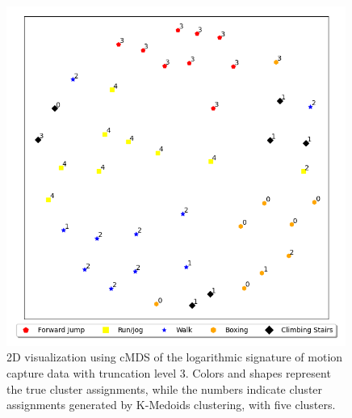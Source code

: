 \begin{figure}
    \centering
    \includegraphics[width=0.99\textwidth]{figures/motion-capture-data/2d_plots/logsig_level3}
    \caption[2D cMDS Visualization of Logarithmic Signature Motion Capture Data (Truncation Level 3)]{2D visualization using cMDS of the logarithmic signature of motion capture data with truncation level 3. Colors and shapes represent the true cluster assignments, while the numbers indicate cluster assignments generated by K-Medoids clustering, with five clusters.}
    \label{fig:2d-logsig-level3}
\end{figure}

